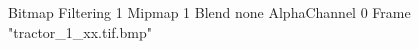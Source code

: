 {Bitmap
	{Filtering 1}
	{Mipmap 1}
	{Blend none}
	{AlphaChannel 0}
	{Frame "tractor_1_xx.tif.bmp"}
}
